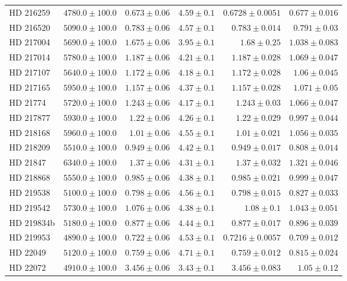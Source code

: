 \begin{longtable*}{lrrrrr}
HD 216259 & $4780.0\pm 100.0$ & $0.673\pm 0.06$ & $4.59\pm 0.1$ & $0.6728\pm 0.0051$ & $0.677\pm 0.016$ \\ 
HD 216520 & $5090.0\pm 100.0$ & $0.783\pm 0.06$ & $4.57\pm 0.1$ & $0.783\pm 0.014$ & $0.791\pm 0.03$ \\ 
HD 217004 & $5690.0\pm 100.0$ & $1.675\pm 0.06$ & $3.95\pm 0.1$ & $1.68\pm 0.25$ & $1.038\pm 0.083$ \\ 
HD 217014 & $5780.0\pm 100.0$ & $1.187\pm 0.06$ & $4.21\pm 0.1$ & $1.187\pm 0.028$ & $1.069\pm 0.047$ \\ 
HD 217107 & $5640.0\pm 100.0$ & $1.172\pm 0.06$ & $4.18\pm 0.1$ & $1.172\pm 0.028$ & $1.06\pm 0.045$ \\ 
HD 217165 & $5950.0\pm 100.0$ & $1.157\pm 0.06$ & $4.37\pm 0.1$ & $1.157\pm 0.028$ & $1.071\pm 0.05$ \\ 
HD 21774 & $5720.0\pm 100.0$ & $1.243\pm 0.06$ & $4.17\pm 0.1$ & $1.243\pm 0.03$ & $1.066\pm 0.047$ \\ 
HD 217877 & $5930.0\pm 100.0$ & $1.22\pm 0.06$ & $4.26\pm 0.1$ & $1.22\pm 0.029$ & $0.997\pm 0.044$ \\ 
HD 218168 & $5960.0\pm 100.0$ & $1.01\pm 0.06$ & $4.55\pm 0.1$ & $1.01\pm 0.021$ & $1.056\pm 0.035$ \\ 
HD 218209 & $5510.0\pm 100.0$ & $0.949\pm 0.06$ & $4.42\pm 0.1$ & $0.949\pm 0.017$ & $0.808\pm 0.014$ \\ 
HD 21847 & $6340.0\pm 100.0$ & $1.37\pm 0.06$ & $4.31\pm 0.1$ & $1.37\pm 0.032$ & $1.321\pm 0.046$ \\ 
HD 218868 & $5550.0\pm 100.0$ & $0.985\pm 0.06$ & $4.38\pm 0.1$ & $0.985\pm 0.021$ & $0.999\pm 0.047$ \\ 
HD 219538 & $5100.0\pm 100.0$ & $0.798\pm 0.06$ & $4.56\pm 0.1$ & $0.798\pm 0.015$ & $0.827\pm 0.033$ \\ 
HD 219542 & $5730.0\pm 100.0$ & $1.076\pm 0.06$ & $4.38\pm 0.1$ & $1.08\pm 0.1$ & $1.043\pm 0.051$ \\ 
HD 219834b & $5180.0\pm 100.0$ & $0.877\pm 0.06$ & $4.44\pm 0.1$ & $0.877\pm 0.017$ & $0.896\pm 0.039$ \\ 
HD 219953 & $4890.0\pm 100.0$ & $0.722\pm 0.06$ & $4.53\pm 0.1$ & $0.7216\pm 0.0057$ & $0.709\pm 0.012$ \\ 
HD 22049 & $5120.0\pm 100.0$ & $0.759\pm 0.06$ & $4.71\pm 0.1$ & $0.759\pm 0.012$ & $0.815\pm 0.024$ \\ 
HD 22072 & $4910.0\pm 100.0$ & $3.456\pm 0.06$ & $3.43\pm 0.1$ & $3.456\pm 0.083$ & $1.05\pm 0.12$ \\ 

\end{longtable*}
